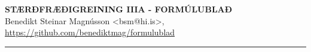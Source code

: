\documentclass[11pt,icelandic,A4]{article}
\begin{document}

\begin{center}
	{\Large\bf STÆRÐFRÆÐIGREINING IIIA - FORMÚLUBLAÐ}\\
    Benedikt Steinar Magnússon <bsm@hi.is>, \url{https://github.com/benediktmag/formulublad}
\end{center}

\hrule



\newpage 



\end{document}
